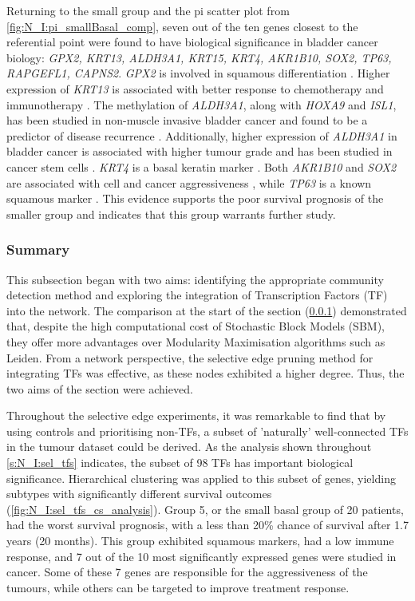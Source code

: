 Returning to the small group and the pi scatter plot from \cref{fig:N_I:pi_smallBasal_comp},
seven out of the ten genes closest to the referential point were found to have biological significance in bladder cancer biology: \textit{GPX2, KRT13, ALDH3A1, KRT15, KRT4, AKR1B10, SOX2, TP63, RAPGEFL1, CAPNS2}. \textit{GPX2} is involved in squamous differentiation \citet{Naiki2018-fp}. Higher expression of \textit{KRT13} is associated with better response to chemotherapy and immunotherapy \citet{Yu2023-db}. The methylation of \textit{ALDH3A1}, along with \textit{HOXA9} and \textit{ISL1}, has been studied in non-muscle invasive bladder cancer and found to be a predictor of disease recurrence \citet{McLean2023-qk}. Additionally, higher expression of \textit{ALDH3A1} in bladder cancer is associated with higher tumour grade and has been studied in cancer stem cells \citet{Kim2013-th}. \textit{KRT4} is a basal keratin marker \citet{Marzouka2018-ge}. Both \textit{AKR1B10} and \textit{SOX2} are associated with cell and cancer aggressiveness \citet{Huang2021-bn, Chiu2020-xh}, while \textit{TP63} is a known squamous marker \citet{Robertson2017-mg}. This evidence supports the poor survival prognosis of the smaller group and indicates that this group warrants further study.


\subsubsection{Summary}

This subsection began with two aims: identifying the appropriate community detection method and exploring the integration of Transcription Factors (TF) into the network. The comparison at the start of the section (\ref{}) demonstrated that, despite the high computational cost of Stochastic Block Models (SBM), they offer more advantages over Modularity Maximisation algorithms such as Leiden. From a network perspective, the selective edge pruning method for integrating TFs was effective, as these nodes exhibited a higher degree. Thus, the two aims of the section were achieved.

Throughout the selective edge experiments, it was remarkable to find that by using controls and prioritising non-TFs, a subset of 'naturally' well-connected TFs in the tumour dataset could be derived. As the analysis shown throughout \cref{s:N_I:sel_tfs} indicates, the subset of 98 TFs has important biological significance. Hierarchical clustering was applied to this subset of genes, yielding subtypes with significantly different survival outcomes (\cref{fig:N_I:sel_tfs_cs_analysis}). Group 5, or the small basal group of 20 patients, had the worst survival prognosis, with a less than 20\% chance of survival after 1.7 years (20 months). This group exhibited squamous markers, had a low immune response, and 7 out of the 10 most significantly expressed genes were studied in cancer. Some of these 7 genes are responsible for the aggressiveness of the tumours, while others can be targeted to improve treatment response.

